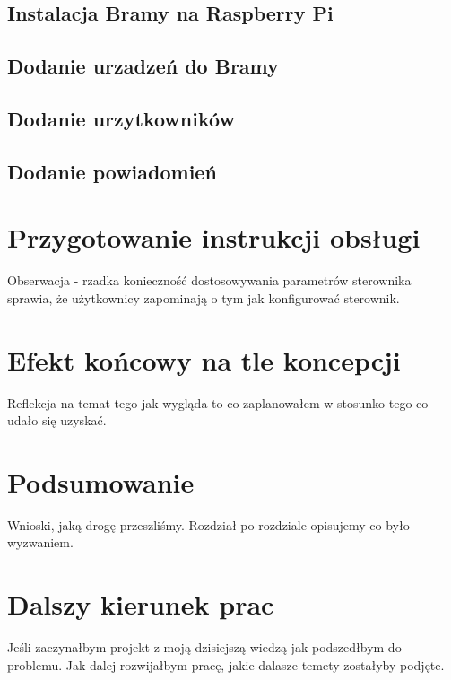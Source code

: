 \documentclass[12pt]{report}
\begin{document}
 \section{Instalacja Bramy na Raspberry Pi}
 \section{Dodanie urzadzeń do Bramy}
 \section{Dodanie urzytkowników}
 \section{Dodanie powiadomień}
 
 \chapter{Przygotowanie instrukcji obsługi}
 Obserwacja - rzadka konieczność dostosowywania parametrów sterownika sprawia, że użytkownicy zapominają o tym jak konfigurować sterownik.
 
 
 \chapter{Efekt końcowy na tle koncepcji}
 Reflekcja na temat tego jak wygląda to co zaplanowałem w stosunko tego co udało się uzyskać.
 
 
 \chapter*{Podsumowanie}
 Wnioski, jaką drogę przeszliśmy. Rozdział po rozdziale opisujemy co było wyzwaniem.
 
 
 \chapter*{Dalszy kierunek prac}
 Jeśli zaczynałbym projekt z moją dzisiejszą wiedzą jak podszedłbym do problemu. Jak dalej rozwijałbym pracę, jakie dalasze temety zostałyby podjęte. 



\end{document}
